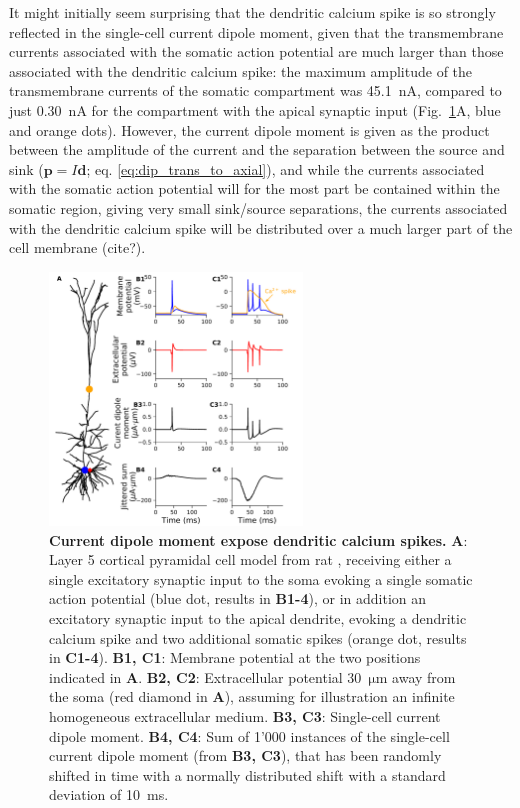 \documentclass[preprint,10pt,authoryear]{elsarticle}
\begin{document}
It might initially seem surprising that the dendritic calcium spike is so strongly reflected in the single-cell current dipole moment, given that the transmembrane currents associated with the somatic action potential are much larger than those associated with the dendritic calcium spike: the maximum amplitude of the transmembrane currents of the somatic compartment was 45.1~$\si{\nA}$, compared to just 0.30~$\si{\nA}$ for the compartment with the apical synaptic input (Fig.~\ref{fig:ca_spike}A, blue and orange dots). However, the current dipole moment is given as the product between the amplitude of the current and the separation between the source and sink ($\mathbf{p}=I\mathbf{d}$; eq. \ref{eq:dip_trans_to_axial}), and while the currents associated with the somatic action potential will for the most part be contained within the somatic region, giving very small sink/source separations, the currents associated with the dendritic calcium spike will be distributed over a much larger part of the cell membrane (cite?).

\begin{figure}[H]
	\centering
	\includegraphics[width=0.6\textwidth]{ca_spike_hay}
	\caption{\textbf{Current dipole moment expose dendritic calcium spikes.}
	\textbf{A}: Layer 5 cortical pyramidal cell model from rat \citep{HAY2011}, receiving either a single excitatory synaptic input to the soma evoking a single somatic action potential (blue dot, results in \textbf{B1-4}), or in addition an excitatory synaptic input to the apical dendrite, evoking a dendritic calcium spike and two additional somatic spikes (orange dot, results in \textbf{C1-4}). 
	\textbf{B1, C1}: Membrane potential at the two positions indicated in \textbf{A}.
	\textbf{B2, C2}: Extracellular potential 30~$\si{\um}$ away from the soma (red diamond in \textbf{A}), assuming for illustration an infinite homogeneous extracellular medium. 
	\textbf{B3, C3}: Single-cell current dipole moment. 
	\textbf{B4, C4}: Sum of 1'000 instances of the single-cell current dipole moment (from \textbf{B3, C3}), that has been randomly shifted in time with a normally distributed shift with a standard deviation of 10~ms.
	}
	\label{fig:ca_spike}
\end{figure}
\end{document}
